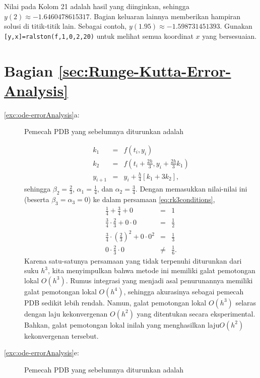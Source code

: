 Nilai pada Kolom 21 adalah hasil yang diinginkan, sehingga $y(2)\approx-1.6460478615317$.
Bagian keluaran lainnya memberikan hampiran solusi di titik-titik
lain. Sebagai contoh, $y(1.95)\approx-1.598731451393$. Gunakan \texttt{{[}y,x{]}=ralston(f,1,0,2,20)}
untuk melihat semua koordinat $x$ yang bersesuaian.

\section*{Bagian \ref{sec:Runge-Kutta-Error-Analysis}}
\begin{description}
\item [{\ref{exc:ode-errorAnalysis}a:}] Pemecah PDB yang sebelumnya diturunkan
adalah 

\begin{eqnarray*}
k_{1} & = & f(t_{i},y_{i})\\
k_{2} & = & f\left(t_{i}+\frac{2h}{3},y_{i}+\frac{2h}{3}k_{1}\right)\\
y_{i+1} & = & y_{i}+\frac{h}{4}\left[k_{1}+3k_{2}\right],
\end{eqnarray*}
sehingga $\beta_{2}=\frac{2}{3}$, $\alpha_{1}=\frac{1}{4}$, dan
$\alpha_{2}=\frac{3}{4}$. Dengan memasukkan nilai-nilai ini (beserta
$\beta_{3}=\alpha_{3}=0$) ke dalam persamaan \ref{eq:rk3conditions},
\begin{eqnarray*}
\frac{1}{4}+\frac{3}{4}+0 & = & 1\\
\frac{3}{4}\cdot\frac{2}{3}+0\cdot0 & = & \frac{1}{2}\\
\frac{3}{4}\cdot\left(\frac{2}{3}\right)^{2}+0\cdot0^{2} & = & \frac{1}{3}\\
0\cdot\frac{2}{3}\cdot0 & \neq & \frac{1}{6}.
\end{eqnarray*}
Karena satu-satunya persamaan yang tidak terpenuhi diturunkan dari
suku $h^{3}$, kita menyimpulkan bahwa metode ini memiliki galat pemotongan
lokal $O(h^{3})$. Rumus integrasi yang menjadi asal penurunannya
memiliki galat pemotongan lokal $O(h^{4})$, sehingga akurasinya sebagai
pemecah PDB sedikit lebih rendah. Namun, galat pemotongan lokal $O(h^{3})$
selaras dengan laju kekonvergenan $O(h^{2})$ yang ditentukan secara
eksperimental. Bahkan, galat pemotongan lokal inilah yang menghasilkan
laju$O(h^{2})$ kekonvergenan tersebut.
\item [{\ref{exc:ode-errorAnalysis}e:}] Pemecah PDB yang sebelumnya diturunkan
adalah 


\end{description}
